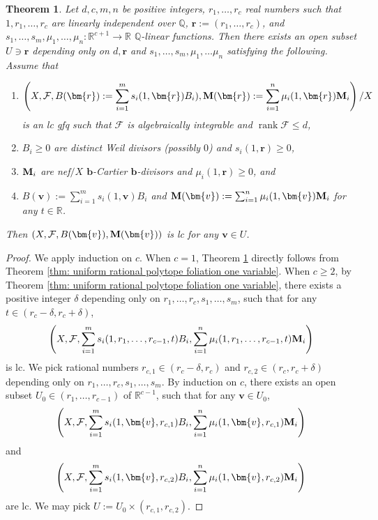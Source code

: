 \documentclass[11pt]{amsart}
\numberwithin{equation}{section}
\newcommand{\bb}{\bm{b}}
\newcommand{\Mm}{{\bf{M}}}
\newcommand{\rk}{\operatorname{rank}}
\newcommand{\Ff}{\mathcal{F}}
\newtheorem{thm}{Theorem}[subsection]
\theoremstyle{definition}
\theoremstyle{definition}
\theoremstyle{definition}
\begin{document}
\begin{thm}\label{thm: uniform rational polytope}
Let $d,c,m,n$ be positive integers, $r_1,\dots,r_c$ real numbers such that $1,r_1,\dots,r_c$ are linearly independent over $\mathbb Q$, $\bm{r}:=(r_1,\dots,r_c)$, and $s_1,\dots,s_m,\mu_1,\dots,\mu_n: \mathbb R^{c+1}\rightarrow\mathbb R$ $\mathbb Q$-linear functions. Then there exists an open subset $U\ni\bm{r}$ depending only on $d,\bm{r}$ and $s_1,\dots,s_m,\mu_1,\dots\mu_n$ satisfying the following. Assume that
\begin{enumerate}
    \item $$\left(X,\Ff,B(\bm{r}):=\sum_{i=1}^ms_i(1,\bm{r})B_i),\Mm(\bm{r}):=\sum_{i=1}^n\mu_i(1,\bm{r})\Mm_i\right)/X$$ is an lc gfq such that $\Ff$ is algebraically integrable and $\rk\Ff\leq d$,
    \item $B_i\geq 0$ are distinct Weil divisors (possibly $0$) and $s_i(1,\bm{r})\geq 0$,
    \item $\Mm_i$ are nef$/X$ $\bb$-Cartier $\bb$-divisors and $\mu_i(1,\bm{r})\geq 0$, and
    \item $B(\bm{v}):=\sum_{i=1}^ms_i(1,\bm{v})B_i$ and   $\Mm(\bm{v}):=\sum_{i=1}^n\mu_i(1,\bm{v})\Mm_i$ for any $t\in\mathbb R$.
\end{enumerate}
Then $(X,\Ff,B(\bm{v}),\Mm(\bm{v}))$ is lc for any $\bm{v}\in U$.
\end{thm}
\begin{proof}
We apply induction on $c$. When $c=1$, Theorem \ref{thm: uniform rational polytope} directly follows from Theorem \ref{thm: uniform rational polytope foliation one variable}. When $c\geq 2$, by Theorem \ref{thm: uniform rational polytope foliation one variable}, there exists a positive integer $\delta$ depending only on $r_1,\dots,r_c,s_1,\dots,s_m$, such that for any $t\in (r_c-\delta,r_c+\delta)$, $$\left(X,\Ff,\sum_{i=1}^ms_i(1,r_1,\dots,r_{c-1},t)B_i,\sum_{i=1}^n\mu_i(1,r_1,\dots,r_{c-1},t)\Mm_i\right)$$ is lc. We pick rational numbers $r_{c,1}\in (r_c-\delta,r_c)$ and $r_{c,2}\in (r_c,r_c+\delta)$ depending only on $r_1,\dots,r_c,s_1,\dots,s_m$. By induction on $c$, there exists an open subset $U_0\in (r_1,\dots,r_{c-1})$ of $\mathbb R^{c-1}$, such that for any $\bm{v}\in U_0$, $$\left(X,\Ff,\sum_{i=1}^ms_i(1,\bm{v},r_{c,1})B_i,\sum_{i=1}^n\mu_i(1,\bm{v},r_{c,1})\Mm_i\right)$$ and $$\left(X,\Ff,\sum_{i=1}^ms_i(1,\bm{v},r_{c,2})B_i,\sum_{i=1}^n\mu_i(1,\bm{v},r_{c,2})\Mm_i\right)$$ are lc. We may pick $U:=U_0\times (r_{c,1},r_{c,2})$.
\end{proof}
\end{document}
